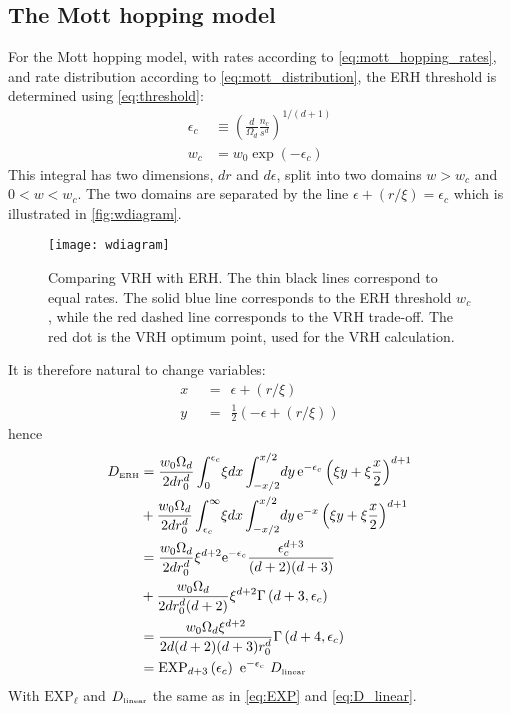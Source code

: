 \subsection{The Mott hopping model}

For the Mott hopping model, with rates according to \autoref{eq:mott_hopping_rates},
and rate distribution according to \autoref{eq:mott_distribution}, the ERH 
threshold is determined using \autoref{eq:threshold}:
%
\begin{align}
\epsilon_c &\equiv \left( \frac{d}{\Omega_d} \frac{n_c}{s^d} \right)^{1/(d+1)} \\
w_c &= w_0\exp(-\epsilon_c) 
\end{align}
%
This integral has two dimensions, $dr$ and $d\epsilon$,
split into two domains 
${w>w_c}$ and ${0<w<w_c}$. The two domains are 
separated by the line ${\epsilon+(r/\xi)=\epsilon_c}$ which is illustrated in \autoref{fig:wdiagram}.

\begin{figure}
\texttt{[image: wdiagram]}
\caption[VRH vs ERH]{Comparing VRH with ERH. The thin black lines 
correspond to equal rates. The solid blue line corresponds to the
ERH threshold $w_c$, while the red dashed line corresponds to the
VRH trade-off. The red dot is the VRH optimum point, used for the
VRH calculation.}
\label{fig:wdiagram}
\end{figure}


It is therefore natural to change variables:
%
\begin{align}
x\ \ &= \ \ \epsilon+(r/\xi) \\
y\ \ &= \ \ \frac{1}{2}\left(-\epsilon+(r/\xi)\right) 
\end{align}
%
hence 
%
\begin{align}
D_{\tbox{ERH}} &= 
\frac{w_0\Omega_d}{2dr_0^d}\int_0^{\epsilon_c}\! \xi dx \int_{-x/2}^{x/2} \! dy \, \eexp{-\epsilon_c} \left(\xi y + \xi \frac{x}{2}\right)^{d+1} 
\nonumber \\
& + \frac{w_0\Omega_d}{2dr_0^d}\int_{\epsilon_c}^{\infty} \! \xi dx \int_{-x/2}^{x/2} \! dy \, \eexp{-x} \left(\xi y+\xi \frac{x}{2}\right)^{d+1} 
\nonumber \\
&= \frac{w_0\Omega_d}{2dr_0^d}\xi^{d+2} \eexp{-\epsilon_c} \frac{\epsilon_c^{d+3}}{(d+2)(d+3)}  
\nonumber \\
& +\frac{w_0\Omega_d}{2dr_0^d(d+2)}\xi^{d+2} \Gamma\left(d+3,\epsilon_c\right)
\nonumber \\
&= \frac{w_0\Omega_d \xi^{d+2}}{2d(d+2)(d+3)r_0^d}\Gamma\left(d+4,\epsilon_c\right) \nonumber\\
&=\mathrm{EXP}_{d{+}3}\left(\epsilon_c\right)  \  \eexp{-\epsilon_c}  \ D_{\tbox{linear}}
\end{align}
%
With $\mathrm{EXP}_\ell$ and $D_{\mbox{\tiny linear}}$ the same as in 
\autoref{eq:EXP} and \autoref{eq:D_linear}.




